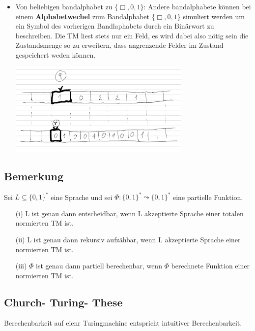 \documentclass[a4paper,11pt]{article}
\begin{document}
\begin{itemize}
  \item Von beliebigen bandalphabet zu $\{\Box, 0, 1\}$: Andere bandalphabete können bei einem \textbf{Alphabetwechel} zum Bandalphabet $\{\Box, 0, 1\}$ simuliert werden um ein Symbol des vorherigen Bandlaphabets durch ein Binärwort zu beschreiben. Die TM liest stets nur ein Feld, es wird dabei also nötig sein die Zustandsmenge so zu erweitern, dass angrenzende Felder im Zustand gespeichert weden können.
  
  \includegraphics[width=0.7\textwidth]{alphabet_wech.png}
\end{itemize}

\subsection{Bemerkung} Sei $L \subseteq \{0, 1\}^*$ eine Sprache und sei $\Phi : \{0, 1\}^* \leadsto \{0, 1\}^*$ eine partielle Funktion.
\begin{itemize}
  \item [(i)] L ist genau dann entscheidbar, wenn L akzeptierte Sprache einer totalen normierten TM ist. 
  \item [(ii)] L ist genau dann rekursiv aufzähbar, wenn L akzeptierte Sprache einer normierten TM ist.
  \item [(iii)] $\Phi$ ist genau dann partiell berechenbar, wenn $\Phi$ berechnete Funktion einer normierten TM ist.
\end{itemize}

\subsection{Church- Turing- These} Berechenbarkeit auf eienr Turingmachine entspricht intuitiver Berechenbarkeit.
\end{document}
